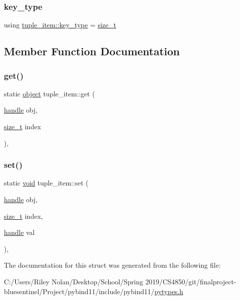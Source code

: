 \subsubsection{\texorpdfstring{key\_type}{key\_type}}
{\footnotesize\ttfamily using \mbox{\hyperlink{structtuple__item_ac6a1e89372fbb8f9f84cf99a012a02ed}{tuple\+\_\+item\+::key\+\_\+type}} =  \mbox{\hyperlink{detail_2common_8h_a801d6a451a01953ef8cbae6feb6a3638}{size\+\_\+t}}}



\subsection{Member Function Documentation}
\mbox{\label{structtuple__item_af80c59a378316fae1a31338a953786f7}} 
\subsubsection{\texorpdfstring{get()}{get()}}
{\footnotesize\ttfamily static \mbox{\hyperlink{classobject}{object}} tuple\+\_\+item\+::get (\begin{DoxyParamCaption}\item[{\mbox{\hyperlink{classhandle}{handle}}}]{obj,  }\item[{\mbox{\hyperlink{detail_2common_8h_a801d6a451a01953ef8cbae6feb6a3638}{size\+\_\+t}}}]{index }\end{DoxyParamCaption})\hspace{0.3cm}{\ttfamily [inline]}, {\ttfamily [static]}}

\mbox{\label{structtuple__item_aeecd66f2a8b6a24b240e54e09d208006}} 
\subsubsection{\texorpdfstring{set()}{set()}}
{\footnotesize\ttfamily static \mbox{\hyperlink{_s_d_l__opengles2__gl2ext_8h_ae5d8fa23ad07c48bb609509eae494c95}{void}} tuple\+\_\+item\+::set (\begin{DoxyParamCaption}\item[{\mbox{\hyperlink{classhandle}{handle}}}]{obj,  }\item[{\mbox{\hyperlink{detail_2common_8h_a801d6a451a01953ef8cbae6feb6a3638}{size\+\_\+t}}}]{index,  }\item[{\mbox{\hyperlink{classhandle}{handle}}}]{val }\end{DoxyParamCaption})\hspace{0.3cm}{\ttfamily [inline]}, {\ttfamily [static]}}



The documentation for this struct was generated from the following file\+:\begin{DoxyCompactItemize}
\item 
C\+:/\+Users/\+Riley Nolan/\+Desktop/\+School/\+Spring 2019/\+C\+S4850/git/finalproject-\/bluesentinel/\+Project/pybind11/include/pybind11/\mbox{\hyperlink{pytypes_8h}{pytypes.\+h}}\end{DoxyCompactItemize}
